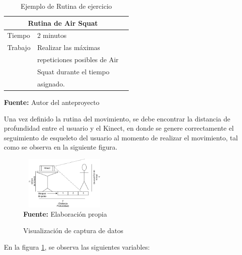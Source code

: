\documentclass[twoside,twocolumn]{article}
\begin{document}
\begin{table}[H]
\caption{Ejemplo de Rutina de ejercicio}
\centering
\begin{tabular}{llr}
\toprule
\multicolumn{2}{c}{Rutina de Air Squat} \\
\midrule
Tiempo & 2 minutos                       \\
Trabajo & Realizar las máximas           \\
        & repeticiones posibles de Air   \\
        & Squat durante el tiempo        \\
        & asignado.                      \\
\bottomrule
\end{tabular}
\textbf{Fuente:} Autor del anteproyecto
\end{table}
\medbreak 
Una vez definido la rutina del movimiento, se debe encontrar la distancia de profundidad entre el usuario y el Kinect, en donde se genere correctamente el seguimiento de esqueleto del usuario al momento de realizar el movimiento, tal como se observa en la siguiente figura.
\begin{figure}[H]
	\caption{Visualización de captura de datos}
	\label{fig:capturaDatos}
	\centering
	\includegraphics[width=170px,height=100px]{img/RecoleccionProfundidad.png} \\
	\textbf{Fuente:} Elaboración propia
\end{figure}
En la figura \ref{fig:capturaDatos}, se observa las siguientes variables:
\end{document}
